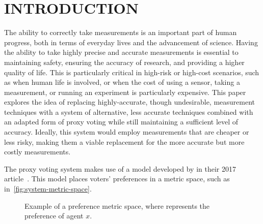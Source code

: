 %
%

\chapter{INTRODUCTION}\label{ch:introduction}
\thispagestyle{empty}

The ability to correctly take measurements is an important part of human
progress, both in terms of everyday lives and the advancement of science.
Having the ability to take highly precise and accurate measurements is essential
to maintaining safety, ensuring the accuracy of research, and providing a
higher quality of life.
This is particularly critical in high-risk or high-cost scenarios, such as when
human life is involved, or when the cost of using a sensor, taking a
measurement, or running an experiment is particularly expensive.
This paper explores the idea of replacing highly-accurate, though undesirable,
measurement techniques with a system of alternative, less accurate techniques combined
with an adapted form of proxy voting while still maintaining a sufficient level of
accuracy.
Ideally, this system would employ measurements that are cheaper or less risky, making
them a viable replacement for the more accurate but more costly measurements.

The proxy voting system makes use of a model developed by  in their 2017
article~\cite{Cohensius2017}.
This model places voters' preferences in a metric space, such as
in~\autoref{fig:system-metric-space}.


\begin{figure}[htbp]
    \centering

    \caption{Example of a preference metric space, where  represents the
    preference of agent $x$.}
    \label{fig:system-metric-space}
\end{figure}





